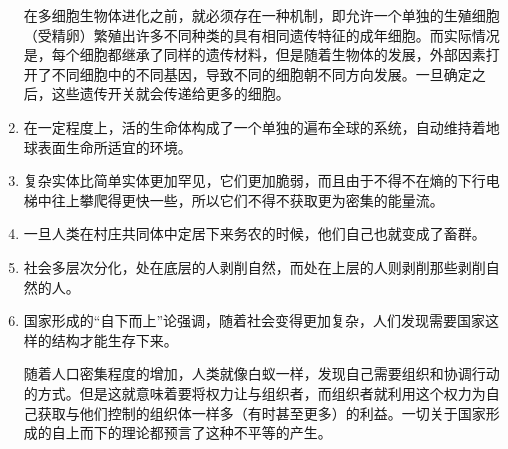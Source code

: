 \documentclass[UTF8]{ctexart}
\begin{document}
\begin{enumerate}
			在多细胞生物体进化之前，就必须存在一种机制，即允许一个单独的生殖细胞（受精卵）繁殖出许多不同种类的具有相同遗传特征的成年细胞。而实际情况是，每个细胞都继承了同样的遗传材料，但是随着生物体的发展，外部因素打开了不同细胞中的不同基因，导致不同的细胞朝不同方向发展。一旦确定之后，这些遗传开关就会传递给更多的细胞。
			\item 在一定程度上，活的生命体构成了一个单独的遍布全球的系统，自动维持着地球表面生命所适宜的环境。
			\item 复杂实体比简单实体更加罕见，它们更加脆弱，而且由于不得不在熵的下行电梯中往上攀爬得更快一些，所以它们不得不获取更为密集的能量流。
			\item 一旦人类在村庄共同体中定居下来务农的时候，他们自己也就变成了畜群。
			\item 社会多层次分化，处在底层的人剥削自然，而处在上层的人则剥削那些剥削自然的人。
			\item 国家形成的“自下而上”论强调，随着社会变得更加复杂，人们发现需要国家这样的结构才能生存下来。
			
			随着人口密集程度的增加，人类就像白蚁一样，发现自己需要组织和协调行动的方式。但是这就意味着要将权力让与组织者，而组织者就利用这个权力为自己获取与他们控制的组织体一样多（有时甚至更多）的利益。一切关于国家形成的自上而下的理论都预言了这种不平等的产生。
			

\end{enumerate}
\end{document}
